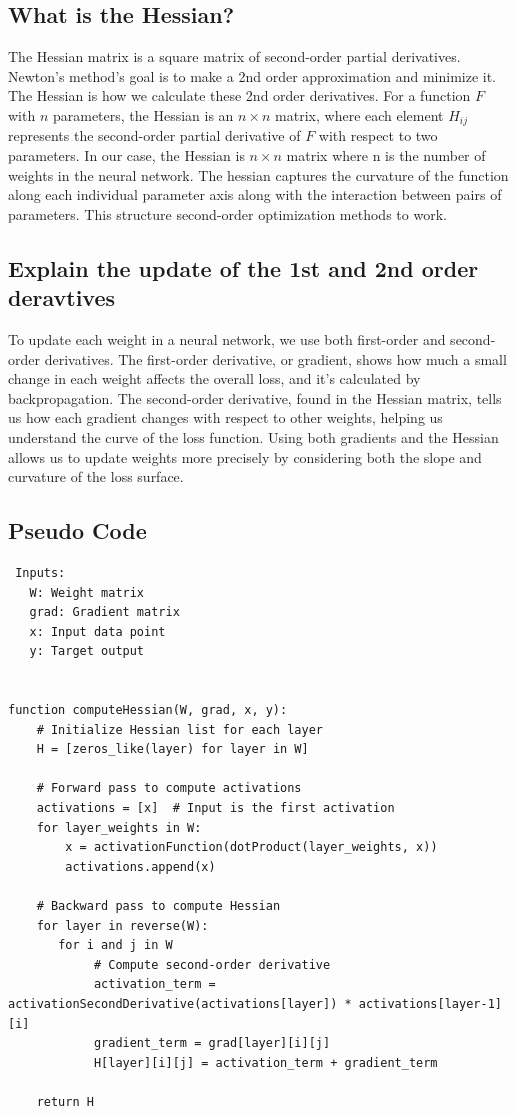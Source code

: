 \documentclass{article}
\begin{document}
\subsection{What is the Hessian?}
The Hessian matrix is a square matrix of second-order partial derivatives. Newton's method's goal is to make a 2nd order approximation and minimize it. The Hessian is how we calculate these 2nd order derivatives. For a function \( F \) with \( n \) parameters, the Hessian is an \( n \times n \) matrix, where each element \( H_{ij} \) represents the second-order partial derivative of \( F \) with respect to two parameters. In our case, the Hessian is \( n \times n \) matrix where n is the number of weights in the neural network. The hessian captures the curvature of the function along each individual parameter axis along with the interaction between pairs of parameters. This structure second-order optimization methods to work.

\subsection{Explain the update of the 1st and 2nd order deravtives}
To update each weight in a neural network, we use both first-order and second-order derivatives. The first-order derivative, or gradient, shows how much a small change in each weight affects the overall loss, and it’s calculated by backpropagation. The second-order derivative, found in the Hessian matrix, tells us how each gradient changes with respect to other weights, helping us understand the curve of the loss function. Using both gradients and the Hessian allows us to update weights more precisely by considering both the slope and curvature of the loss surface.

\subsection{Pseudo Code}

\begin{verbatim}
 Inputs:
   W: Weight matrix 
   grad: Gradient matrix 
   x: Input data point
   y: Target output


function computeHessian(W, grad, x, y):
    # Initialize Hessian list for each layer
    H = [zeros_like(layer) for layer in W]

    # Forward pass to compute activations
    activations = [x]  # Input is the first activation
    for layer_weights in W:
        x = activationFunction(dotProduct(layer_weights, x))
        activations.append(x)

    # Backward pass to compute Hessian
    for layer in reverse(W):
       for i and j in W
            # Compute second-order derivative
            activation_term = activationSecondDerivative(activations[layer]) * activations[layer-1][i]
            gradient_term = grad[layer][i][j]
            H[layer][i][j] = activation_term + gradient_term

    return H

\end{verbatim}
\end{document}
